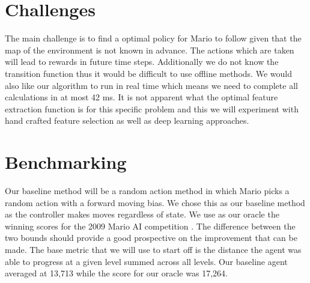 \documentclass[12pt]{article}
\begin{document}
\section{Challenges}

The main challenge is to find a optimal policy for Mario to follow given that the map of the environment is not known in advance. The actions which are taken will lead to rewards in future time steps. Additionally we do not know the transition function thus it would be difficult to use offline methods. We would also like our algorithm to run in real time which means we need to complete all calculations in at most 42 ms. It is not apparent what the optimal feature extraction function is for this specific problem and this we will experiment with hand crafted feature selection as well as deep learning approaches.


\section{Benchmarking}

Our baseline method will be a random action method in which Mario picks a random action with a forward moving bias. We chose this as our baseline method as the controller makes moves regardless of state. We use as our oracle the winning scores for the 2009 Mario AI competition \cite{karakovskiy2012mario}. The difference between the two bounds should provide a good prospective on the improvement that can be made. The base metric that we will use to start off is the distance the agent was able to progress at a given level summed across all levels. Our baseline agent averaged at 13,713 while the score for our oracle was 17,264.

\printbibliography
\end{document}
